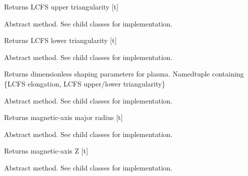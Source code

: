 \documentclass[letterpaper,10pt,english]{sphinxmanual}
\begin{document}
\begin{fulllineitems}
\begin{fulllineitems}
Returns LCFS upper triangularity {[}t{]}

\end{fulllineitems}


\begin{fulllineitems}
\label{eqtools:eqtools.core.Equilibrium.getLowerTriangularity}
Abstract method.  See child classes for implementation.

Returns LCFS lower triangularity {[}t{]}

\end{fulllineitems}


\begin{fulllineitems}
\label{eqtools:eqtools.core.Equilibrium.getShaping}
Abstract method.  See child classes for implementation.

Returns dimensionless shaping parameters for plasma.
Namedtuple containing \{LCFS elongation, LCFS upper/lower triangularity\}

\end{fulllineitems}


\begin{fulllineitems}
\label{eqtools:eqtools.core.Equilibrium.getMagR}
Abstract method.  See child classes for implementation.

Returns magnetic-axis major radius {[}t{]}

\end{fulllineitems}


\begin{fulllineitems}
\label{eqtools:eqtools.core.Equilibrium.getMagZ}
Abstract method.  See child classes for implementation.

Returns magnetic-axis Z {[}t{]}

\end{fulllineitems}


\begin{fulllineitems}
\label{eqtools:eqtools.core.Equilibrium.getAreaLCFS}
Abstract method.  See child classes for implementation.


\end{fulllineitems}
\end{fulllineitems}
\end{document}

